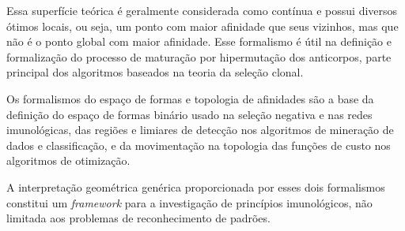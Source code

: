 Essa superfície teórica é geralmente considerada como contínua e possui diversos ótimos locais, ou seja, um ponto com maior afinidade que seus vizinhos, mas que não é o ponto global com maior afinidade. Esse formalismo é útil na definição e formalização do processo de maturação por hipermutação dos anticorpos, parte principal dos algoritmos baseados na teoria da seleção clonal.

Os formalismos do espaço de formas e topologia de afinidades são a base da definição do espaço de formas binário usado na seleção negativa e nas redes imunológicas, das regiões e limiares de detecção nos algoritmos de mineração de dados e classificação, e da movimentação na topologia das funções de custo nos algoritmos de otimização.

A interpretação geométrica genérica proporcionada por esses dois formalismos constitui um \emph{framework} para a investigação de princípios imunológicos, não limitada aos problemas de reconhecimento de padrões.

